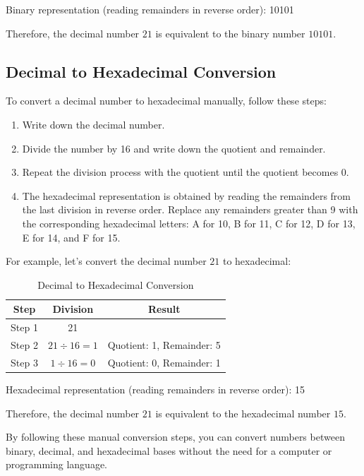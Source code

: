 \documentclass[12pt]{book}
\begin{document}
Binary representation (reading remainders in reverse order): 10101


Therefore, the decimal number $21$ is equivalent to the binary number $10101$.

\subsection{Decimal to Hexadecimal Conversion}

To convert a decimal number to hexadecimal manually, follow these steps:

\begin{enumerate}
\item Write down the decimal number.
\item Divide the number by 16 and write down the quotient and remainder.
\item Repeat the division process with the quotient until the quotient becomes 0.
\item The hexadecimal representation is obtained by reading the remainders from the last division in reverse order. Replace any remainders greater than 9 with the corresponding hexadecimal letters: A for 10, B for 11, C for 12, D for 13, E for 14, and F for 15.
\end{enumerate}

For example, let's convert the decimal number $21$ to hexadecimal:

\begin{table}[h]
\centering
\caption{Decimal to Hexadecimal Conversion}
\begin{tabular}{|c|c|c|}
\hline
\textbf{Step} & \textbf{Division} & \textbf{Result} \\
\hline
Step 1 & 21 & \\
\hline
Step 2 & $21 \div 16 = 1$ & Quotient: 1, Remainder: 5 \\
\hline
Step 3 & $1 \div 16 = 0$ & Quotient: 0, Remainder: 1 \\
\hline
\end{tabular}
\end{table}

Hexadecimal representation (reading remainders in reverse order): 15

Therefore, the decimal number $21$ is equivalent to the hexadecimal number $15$.

By following these manual conversion steps, you can convert numbers between binary, decimal, and hexadecimal bases without the need for a computer or programming language.
\end{document}
